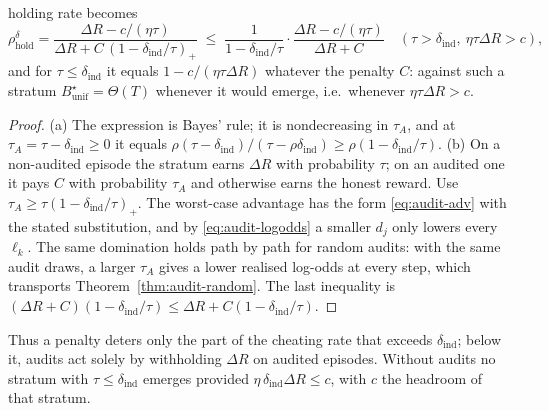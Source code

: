 \begin{proposition}
\begin{enumerate}
holding rate becomes
\[
  \rho^{\delta}_{\mathrm{hold}}=\frac{\Delta R-c/(\eta\tau)}{\Delta R+C\,(1-\delta_{\mathrm{ind}}/\tau)_+}
  \;\le\;\frac{1}{1-\delta_{\mathrm{ind}}/\tau}\cdot\frac{\Delta R-c/(\eta\tau)}{\Delta R+C}
  \quad(\tau>\delta_{\mathrm{ind}},\ \eta\tau\Delta R>c),
\]
and for $\tau\le\delta_{\mathrm{ind}}$ it equals $1-c/(\eta\tau\Delta R)$
whatever the penalty $C$: against such a stratum $B^\star_{\mathrm{unif}}=\Theta(T)$
whenever it would emerge, i.e.\ whenever $\eta\tau\Delta R>c$.
\end{enumerate}
\end{proposition}
\begin{proof}
(a) The expression is Bayes' rule; it is nondecreasing in $\tau_A$, and at
$\tau_A=\tau-\delta_{\mathrm{ind}}\ge0$ it equals
$\rho(\tau-\delta_{\mathrm{ind}})/(\tau-\rho\delta_{\mathrm{ind}})\ge\rho(1-\delta_{\mathrm{ind}}/\tau)$.
(b) On a non-audited episode the stratum earns $\Delta R$ with probability
$\tau$; on an audited one it pays $C$ with probability $\tau_A$ and otherwise
earns the honest reward. Use $\tau_A\ge\tau(1-\delta_{\mathrm{ind}}/\tau)_+$.
The worst-case advantage has the form \eqref{eq:audit-adv} with the stated
substitution, and by \eqref{eq:audit-logodds} a smaller $d_j$ only lowers every
$\ell_k$. The same domination holds path by path for random audits: with the same audit draws, a larger $\tau_A$ gives a lower realised log-odds at every step, which transports Theorem~\ref{thm:audit-random}. The last inequality is
$(\Delta R+C)(1-\delta_{\mathrm{ind}}/\tau)\le\Delta R+C(1-\delta_{\mathrm{ind}}/\tau)$.
\end{proof}
\noindent
Thus a penalty deters only the part of the cheating rate that exceeds
$\delta_{\mathrm{ind}}$; below it, audits act solely by withholding $\Delta R$
on audited episodes. Without audits no stratum with
$\tau\le\delta_{\mathrm{ind}}$ emerges provided
$\eta\,\delta_{\mathrm{ind}}\Delta R\le c$, with $c$ the headroom of that
stratum.

